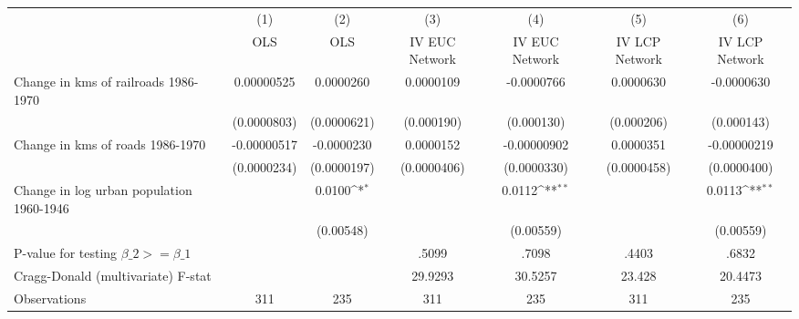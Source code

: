 {
\def\sym#1{\ifmmode^{#1}\else\(^{#1}\)\fi}
\begin{tabular}{l*{6}{c}}
\hline\hline
                &\multicolumn{1}{c}{(1)}&\multicolumn{1}{c}{(2)}&\multicolumn{1}{c}{(3)}&\multicolumn{1}{c}{(4)}&\multicolumn{1}{c}{(5)}&\multicolumn{1}{c}{(6)}\\
                &\multicolumn{1}{c}{OLS}&\multicolumn{1}{c}{OLS}&\multicolumn{1}{c}{IV EUC Network}&\multicolumn{1}{c}{IV EUC Network}&\multicolumn{1}{c}{IV LCP Network}&\multicolumn{1}{c}{IV LCP Network}\\
\hline
Change in kms of railroads 1986-1970&0.00000525         &0.0000260         &0.0000109         &-0.0000766         &0.0000630         &-0.0000630         \\
                &(0.0000803)         &(0.0000621)         &(0.000190)         &(0.000130)         &(0.000206)         &(0.000143)         \\
[1em]
Change in kms of roads 1986-1970&-0.00000517         &-0.0000230         &0.0000152         &-0.00000902         &0.0000351         &-0.00000219         \\
                &(0.0000234)         &(0.0000197)         &(0.0000406)         &(0.0000330)         &(0.0000458)         &(0.0000400)         \\
[1em]
Change in log urban population 1960-1946&                  &   0.0100\sym{*}  &                  &   0.0112\sym{**} &                  &   0.0113\sym{**} \\
                &                  &(0.00548)         &                  &(0.00559)         &                  &(0.00559)         \\
\hline
P-value for testing $\beta\_{2} >= \beta\_{1}$&                  &                  &    .5099         &    .7098         &    .4403         &    .6832         \\
Cragg-Donald (multivariate) F-stat&                  &                  &  29.9293         &  30.5257         &   23.428         &  20.4473         \\
Observations    &      311         &      235         &      311         &      235         &      311         &      235         \\
\hline\hline
\end{tabular}
}
